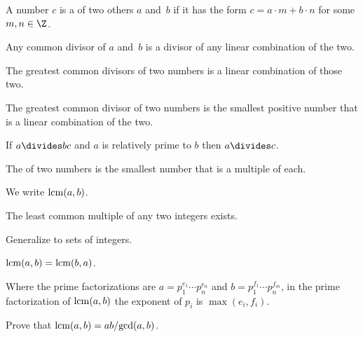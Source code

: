\documentclass{ibl}
\begin{document}
\begin{df}
A number $c$ is a  of two others $a$ and~$b$
if it has the form $c=a\cdot m+b\cdot n$ for some $m,n\in\Z$.  
\end{df}

\begin{ex}
\begin{exes}
\item Any common divisor of $a$ and~$b$ is a divisor of 
any linear combination of the two.
\item The greatest common divisors of two numbers is a linear combination of 
those two.
\item The greatest common divisor of two numbers is the smallest positive
number that is a linear combination of the two.
\end{exes}
\end{ex}

\begin{ex}
If $a\divides bc$ and $a$ is relatively prime to $b$ then $a\divides c$.  
\end{ex}

\begin{df}
The  of two numbers is the smallest number
that is a multiple of each.
\end{df}

\begin{ex} We write $\operatorname{lcm}(a,b)$.
\begin{exes}
\item The least common multiple of any two integers exists.
\item Generalize to sets of integers.
\item $\operatorname{lcm}(a,b)=\operatorname{lcm}(b,a)$.
\end{exes}
\end{ex}

\begin{ex}
Where the prime factorizations are $a=p_1^{e_1}\cdots p_n^{e_n}$
and $b=p_1^{f_1}\cdots p_n^{f_m}$, 
in the prime factorization of $\operatorname{lcm}(a,b)$ the exponent of 
$p_i$ is $\max(e_i,f_i)$.
\end{ex}

\begin{ex}
Prove that $\operatorname{lcm}(a,b)=ab/\!\gcd(a,b)$.
\end{ex}
\end{document}
